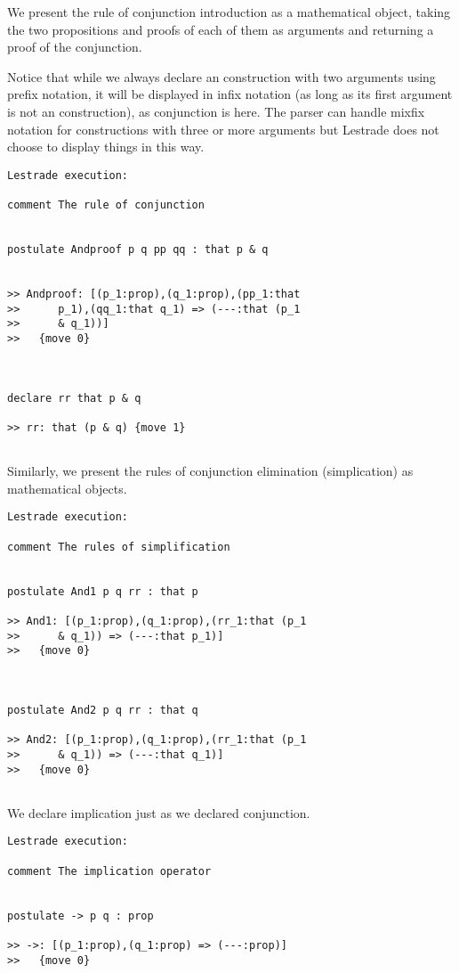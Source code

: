 \documentclass[12pt]{article}
\begin{document}
We present the rule of conjunction introduction as a mathematical object, taking the two propositions and proofs of each of them as arguments
and returning a proof of the conjunction.

Notice that while we always declare an construction with two arguments using prefix notation, it will be displayed in infix notation (as long as its first argument is not an construction), as conjunction is here.
The parser can handle mixfix notation for constructions with three or more arguments but Lestrade does not choose to display things in this way.

\begin{verbatim}Lestrade execution:

comment The rule of conjunction


postulate Andproof p q pp qq : that p & q


>> Andproof: [(p_1:prop),(q_1:prop),(pp_1:that
>>      p_1),(qq_1:that q_1) => (---:that (p_1
>>      & q_1))]
>>   {move 0}



declare rr that p & q

>> rr: that (p & q) {move 1}


\end{verbatim}

Similarly, we present the rules of conjunction elimination (simplication) as mathematical objects.

\begin{verbatim}Lestrade execution:

comment The rules of simplification


postulate And1 p q rr : that p

>> And1: [(p_1:prop),(q_1:prop),(rr_1:that (p_1
>>      & q_1)) => (---:that p_1)]
>>   {move 0}



postulate And2 p q rr : that q

>> And2: [(p_1:prop),(q_1:prop),(rr_1:that (p_1
>>      & q_1)) => (---:that q_1)]
>>   {move 0}


\end{verbatim}

We declare implication just as we declared conjunction.

\begin{verbatim}Lestrade execution:

comment The implication operator


postulate -> p q : prop

>> ->: [(p_1:prop),(q_1:prop) => (---:prop)]
>>   {move 0}


\end{verbatim}
\end{document}
